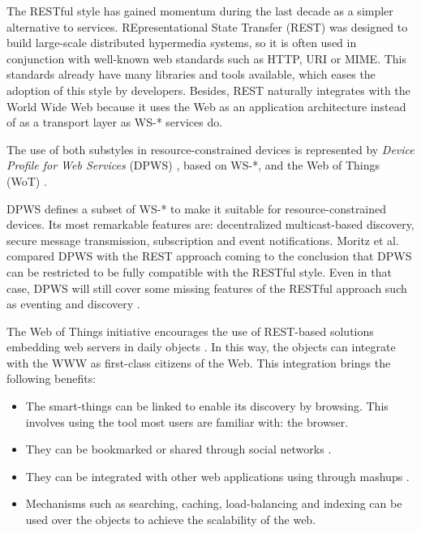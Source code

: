 The RESTful style has gained momentum during the last decade as a simpler alternative to services.
REpresentational State Transfer (REST) was designed to build large-scale distributed hypermedia systems,
so it is often used in conjunction with well-known web standards such as HTTP, URI or MIME.
This standards already have many libraries and tools available, which eases the adoption of this style by developers.
Besides, REST naturally integrates with the World Wide Web because it uses the Web as an application architecture instead of as a transport layer as WS-* services do.


\medskip


The use of both substyles in resource-constrained devices is represented by
\textit{Device Profile for Web Services} (DPWS) \cite{moritz_devices_2010}, based on WS-*,
and the Web of Things (WoT) \cite{guinard_internet_2011}. %


DPWS defines a subset of WS-* to make it suitable for resource-constrained devices.
Its most remarkable features are: decentralized multicast-based discovery, secure message transmission, subscription and event notifications.
Moritz et al. compared DPWS with the REST approach coming to the conclusion that DPWS can be restricted to be fully compatible with the RESTful style.
Even in that case, DPWS will still cover some missing features of the RESTful approach such as eventing and discovery \cite{moritz_devices_2010}.


The Web of Things initiative encourages the use of REST-based solutions embedding web servers in daily objects \cite{guinard_internet_2011}.
In this way, the objects can integrate with the WWW as first-class citizens of the Web.
This integration brings the following benefits:
\begin{itemize}
  \item The smart-things can be linked to enable its discovery by browsing. This involves using the tool most users are familiar with: the browser.
  \item They can be bookmarked or shared through social networks \cite{guinard_sharing_2010}.
  \item They can be integrated with other web applications using through mashups \cite{ostermaier_webplug:_2010}. %
  \item Mechanisms such as searching, caching, load-balancing and indexing can be used over the objects to achieve the scalability of the web. %
\end{itemize}


